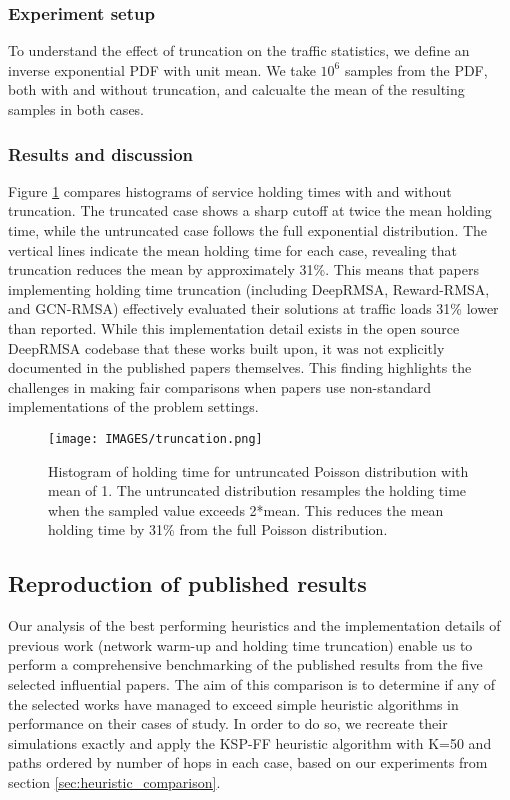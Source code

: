 \subsubsection{Experiment setup}
To understand the effect of truncation on the traffic statistics, we define an inverse exponential PDF with unit mean. We take $10^{6}$ samples from the PDF, both with and without truncation, and calcualte the mean of the resulting samples in both cases.

\subsubsection{Results and discussion}
Figure \ref{fig:truncation} compares histograms of service holding times with and without truncation. The truncated case shows a sharp cutoff at twice the mean holding time, while the untruncated case follows the full exponential distribution. The vertical lines indicate the mean holding time for each case, revealing that truncation reduces the mean by approximately 31\%. This means that papers implementing holding time truncation (including DeepRMSA, Reward-RMSA, and GCN-RMSA) effectively evaluated their solutions at traffic loads 31\% lower than reported. While this implementation detail exists in the open source DeepRMSA codebase that these works built upon, it was not explicitly documented in the published papers themselves. This finding highlights the challenges in making fair comparisons when papers use non-standard implementations of the problem settings.

\begin{figure}
    \centering
    \texttt{[image: IMAGES/truncation.png]}
    \caption{Histogram of holding time for untruncated Poisson distribution with mean of 1. The untruncated distribution resamples the holding time when the sampled value exceeds 2*mean. This reduces the mean holding time by 31\% from the full Poisson distribution.}
    \label{fig:truncation}
\end{figure}









\subsection{Reproduction of published results}
\label{sec:repro}

Our analysis of the best performing heuristics and the implementation details of previous work (network warm-up and holding time truncation) enable us to perform a comprehensive benchmarking of the published results from the five selected influential papers. The aim of this comparison is to determine if any of the selected works have managed to exceed simple heuristic algorithms in performance on their cases of study. In order to do so, we recreate their simulations exactly and apply the KSP-FF heuristic algorithm with K=50 and paths ordered by number of hops in each case, based on our experiments from section \ref{sec:heuristic_comparison}.


